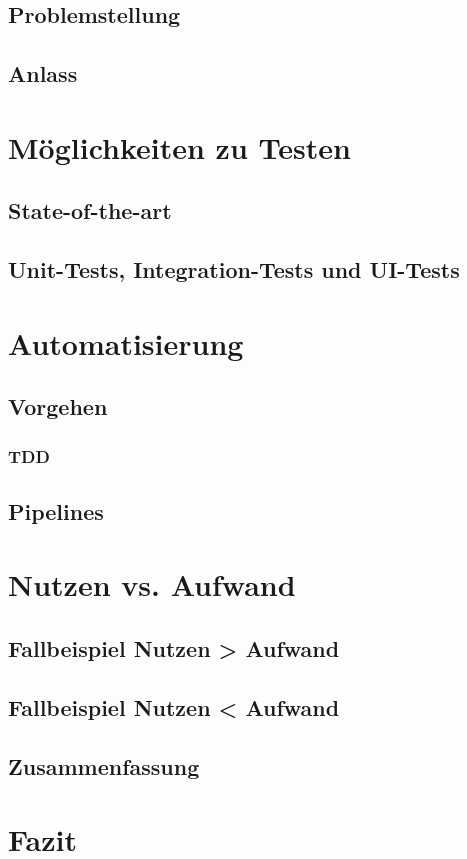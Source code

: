 \section{Problemstellung}
\section{Anlass}
\chapter{Möglichkeiten zu Testen}
\section{State-of-the-art}
\section{Unit-Tests, Integration-Tests und UI-Tests}
\chapter{Automatisierung}
\section{Vorgehen}
\subsection{TDD}
\section{Pipelines}
\chapter{Nutzen vs. Aufwand}
\section{Fallbeispiel Nutzen > Aufwand}
\section{Fallbeispiel Nutzen < Aufwand}
\section{Zusammenfassung}
\chapter{Fazit}